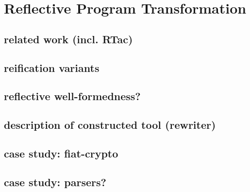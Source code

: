 \chapter{Reflective Program Transformation} \label{ch:reflection}

\section{related work (incl. RTac)}

\section{reification variants}

\section{reflective well-formedness?}

\section{description of constructed tool (rewriter)}

\section{case study: fiat-crypto}

\section{case study: parsers?}
